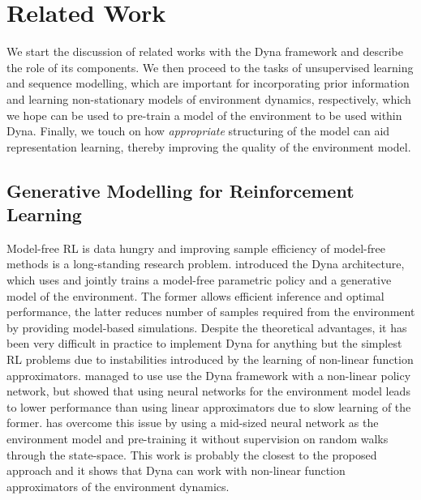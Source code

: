 \section{Related Work}
\label{sec:lit}



    We start the discussion of related works with the Dyna framework and describe the role of its components. We then proceed to the tasks of unsupervised learning and sequence modelling, which are important for incorporating prior information and learning non-stationary models of environment dynamics, respectively, which we hope can be used to pre-train a model of the environment to be used within Dyna. Finally, we touch on how \emph{appropriate} structuring of the model can aid representation learning, thereby improving the quality of the environment model.
    
    \subsection{Generative Modelling for Reinforcement Learning}
        Model-free RL is data hungry and improving sample efficiency of model-free methods is a long-standing research problem. \cite{Sutton1991} introduced the Dyna architecture, which uses and jointly trains a model-free parametric policy and a generative model of the environment. The former allows efficient inference and optimal performance, the latter reduces number of samples required from the environment by providing model-based simulations.
        Despite the theoretical advantages, it has been very difficult in practice to implement Dyna for anything but the simplest RL problems due to instabilities introduced by the learning of non-linear function approximators.
        \cite{Gu2016} managed to use use the Dyna framework with a non-linear policy network, but showed that using neural networks for the environment model leads to lower performance than using linear approximators due to slow learning of the former. 
        \cite{Nagabandi2017} has overcome this issue by using a mid-sized neural network as the environment model and pre-training it without supervision on random walks through the state-space. This work is probably the closest to the proposed approach and it shows that Dyna can work with non-linear function approximators of the environment dynamics.
        
